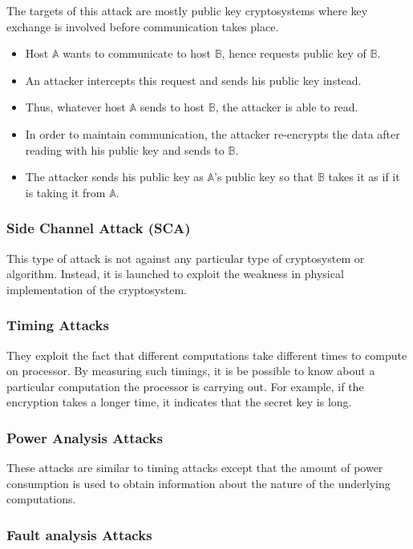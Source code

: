 \documentclass[british]{article}
\begin{document}
The targets of this attack are mostly public key cryptosystems where
key exchange is involved before communication takes place.
\begin{itemize}
	\item Host $\mathbb{A}$ wants to communicate to host $\mathbb{B}$, hence
	      requests public key of $\mathbb{B}$.
	\item An attacker intercepts this request and sends his public key instead.
	\item Thus, whatever host $\mathbb{A}$ sends to host $\mathbb{B}$, the
	      attacker is able to read.
	\item In order to maintain communication, the attacker re-encrypts the data
	      after reading with his public key and sends to $\mathbb{B}$.
	\item The attacker sends his public key as $\mathbb{A}$'s public key so
	      that $\mathbb{B}$ takes it as if it is taking it from $\mathbb{A}$.
\end{itemize}

\subsubsection{Side Channel Attack (SCA)}

This type of attack is not against any particular type of cryptosystem
or algorithm. Instead, it is launched to exploit the weakness in physical
implementation of the cryptosystem.

\subsubsection{Timing Attacks}

They exploit the fact that different computations take different times
to compute on processor. By measuring such timings, it is be possible
to know about a particular computation the processor is carrying out.
For example, if the encryption takes a longer time, it indicates that
the secret key is long.

\subsubsection{Power Analysis Attacks}

These attacks are similar to timing attacks except that the amount
of power consumption is used to obtain information about the nature
of the underlying computations.

\subsubsection{Fault analysis Attacks}
\end{document}
